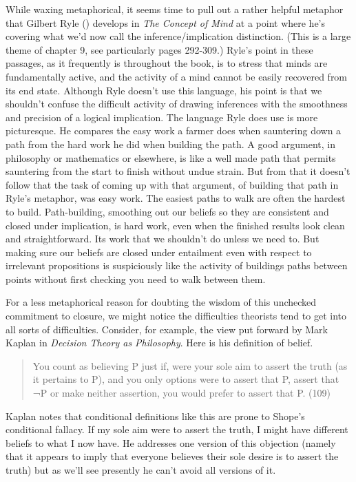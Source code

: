 \documentclass[
  11pt,
  letterpaper,
  DIV=11,
  numbers=noendperiod,
  twoside]{scrartcl}
\begin{document}
While waxing metaphorical, it seems time to pull out a rather helpful
metaphor that Gilbert Ryle () develops in
\emph{The Concept of Mind} at a point where he's covering what we'd now
call the inference/implication distinction. (This is a large theme of
chapter 9, see particularly pages 292-309.) Ryle's point in these
passages, as it frequently is throughout the book, is to stress that
minds are fundamentally active, and the activity of a mind cannot be
easily recovered from its end state. Although Ryle doesn't use this
language, his point is that we shouldn't confuse the difficult activity
of drawing inferences with the smoothness and precision of a logical
implication. The language Ryle does use is more picturesque. He compares
the easy work a farmer does when sauntering down a path from the hard
work he did when building the path. A good argument, in philosophy or
mathematics or elsewhere, is like a well made path that permits
sauntering from the start to finish without undue strain. But from that
it doesn't follow that the task of coming up with that argument, of
building that path in Ryle's metaphor, was easy work. The easiest paths
to walk are often the hardest to build. Path-building, smoothing out our
beliefs so they are consistent and closed under implication, is hard
work, even when the finished results look clean and straightforward. Its
work that we shouldn't do unless we need to. But making sure our beliefs
are closed under entailment even with respect to irrelevant propositions
is suspiciously like the activity of buildings paths between points
without first checking you need to walk between them.

For a less metaphorical reason for doubting the wisdom of this unchecked
commitment to closure, we might notice the difficulties theorists tend
to get into all sorts of difficulties. Consider, for example, the view
put forward by Mark Kaplan in \emph{Decision Theory as Philosophy}. Here
is his definition of belief.

\begin{quote}
You count as believing P just if, were your sole aim to assert the truth
(as it pertains to P), and you only options were to assert that P,
assert that ¬P or make neither assertion, you would prefer to assert
that P. (109)
\end{quote}

Kaplan notes that conditional definitions like this are prone to Shope's
conditional fallacy. If my sole aim were to assert the truth, I might
have different beliefs to what I now have. He addresses one version of
this objection (namely that it appears to imply that everyone believes
their sole desire is to assert the truth) but as we'll see presently he
can't avoid all versions of it.
\end{document}

